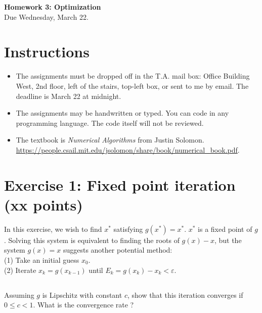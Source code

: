 


\begin{center}
{\large\textbf{Homework 3: Optimization}}\\
Due Wednesday, March 22.
\end{center}

\noindent\makebox[\linewidth]{\rule{\linewidth}{0.6pt}}
 
\section*{Instructions}

\begin{itemize}
\item The assignments must be dropped off in the T.A. mail box: Office Building West, 2nd floor, left of the stairs, top-left box, or sent to me by email. The deadline is March 22  at midnight.
\item The assignments may be handwritten or typed. You can code in any programming language. The code itself will not be reviewed. 
\item The textbook is \emph{Numerical Algorithms} from Justin Solomon.\\ \url{https://people.csail.mit.edu/jsolomon/share/book/numerical_book.pdf}.  
\end{itemize}



\noindent\makebox[\linewidth]{\rule{\linewidth}{0.6pt}}

\section*{Exercise 1:  Fixed point iteration \normalsize \textnormal(xx points)}

In this exercise, we wish to find $x^*$ satisfying $g(x^*) = x^*$. $x^*$ is a fixed point of $g$. Solving this system is equivalent to finding the roots of $g(x) - x$, but the system $g(x) = x$ suggests another potential method:\\
(1) Take an initial guess $x_0$.\\
(2) Iterate $x_k = g(x_{k-1})$ until $E_k = g(x_k) - x_k < \varepsilon$. 

\subsection{} Assuming $g$ is Lipschitz with constant $c$, show that this iteration converges if $0 \leq c < 1$. What is the convergence rate ?

